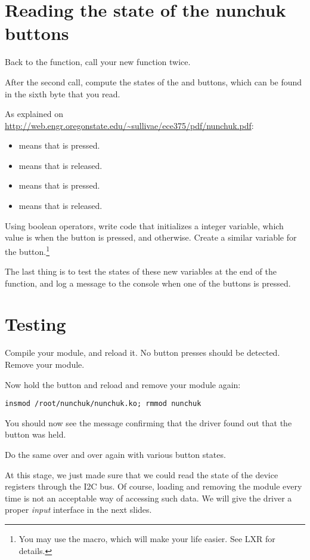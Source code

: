 \section{Reading the state of the nunchuk buttons}

Back to the  function, call your new function twice.

After the second call, compute the states of the  and 
buttons, which can be found in the sixth byte that you read.

As explained on
\url{http://web.engr.oregonstate.edu/~sullivae/ece375/pdf/nunchuk.pdf}:

\begin{itemize}
\item {} means that  is pressed. 
\item {} means that  is released. 
\item {} means that  is pressed. 
\item {} means that  is released. 
\end{itemize}

Using boolean operators, write code that initializes a 
integer variable, which value is  when the  button is
pressed, and  otherwise. Create a similar 
variable for the  button.\footnote{You may use the 
macro, which will make your life easier. See LXR for details.}

The last thing is to test the states of these new variables at the end
of the  function, and log a message to the console
when one of the buttons is pressed.

\section{Testing}

Compile your module, and reload it. No button presses should be
detected. Remove your module.

Now hold the  button and reload and remove your module again:
\begin{verbatim}
insmod /root/nunchuk/nunchuk.ko; rmmod nunchuk
\end{verbatim}

You should now see the message confirming that the driver found
out that the  button was held.

Do the same over and over again with various button states.

At this stage, we just made sure that we could read the state
of the device registers through the I2C bus. Of course, loading and
removing the module every time is not an acceptable way of 
accessing such data. We will give the driver a proper {\em input}
interface in the next slides.
